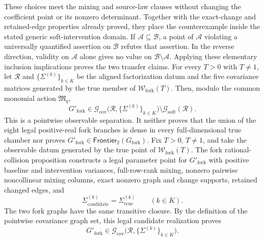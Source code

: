 These choices meet the mixing and source-law clauses without changing the coefficient point or its nonzero determinant.  Together with the exact-change and retained-edge properties already proved, they place the counterexample inside the stated generic soft-intervention domain.  If \(\mathcal A\subseteq\mathcal B\), a point of \(\mathcal A\) violating a universally quantified assertion on \(\mathcal B\) refutes that assertion.  In the reverse direction, validity on \(\mathcal A\) alone gives no value on \(\mathcal B\setminus\mathcal A\).  Applying these elementary inclusion implications proves the two transfer claims.
For every \(T>0\) with \(T\ne1\), let \(\mathcal R\) and \(\{\Sigma^{(k)}\}_{k\in K}\) be the aligned factorization datum and the five covariance matrices generated by the true member of \(\mathcal W_{\mathrm{fork}}(T)\).  Then, modulo the common monomial action \(\mathfrak M_q\),
\[
 G'_{\mathrm{fork}}\in
 \mathcal G_{\mathrm{cov}}\bigl(\mathcal R,\{\Sigma^{(k)}\}_{k\in K}\bigr)
 \setminus
 \mathcal G_{\mathrm{soft}}(\mathcal R).
\]
This is a pointwise observable separation.  It neither proves that the union of the eight legal positive-real fork branches is dense in every full-dimensional true chamber nor proves \(G'_{\mathrm{fork}}\in\mathsf{Frontier}_2(G_{\mathrm{fork}})\).
Fix \(T>0\), \(T\ne1\), and take the observable datum generated by the true point of \(\mathcal W_{\mathrm{fork}}(T)\).  The fork rational-collision proposition constructs a legal parameter point for \(G'_{\mathrm{fork}}\) with positive baseline and intervention variances, full-row-rank mixing, nonzero pairwise noncollinear mixing columns, exact nonzero graph and change supports, retained changed edges, and
\[
 \Sigma^{(k)}_{\mathrm{candidate}}
 =\Sigma^{(k)}_{\mathrm{true}}
 \qquad(k\in K).
\]
The two fork graphs have the same transitive closure.  By the definition of the pointwise covariance graph set, this legal candidate realization proves
\[
 G'_{\mathrm{fork}}\in
 \mathcal G_{\mathrm{cov}}\bigl(\mathcal R,\{\Sigma^{(k)}\}_{k\in K}\bigr).
\]

